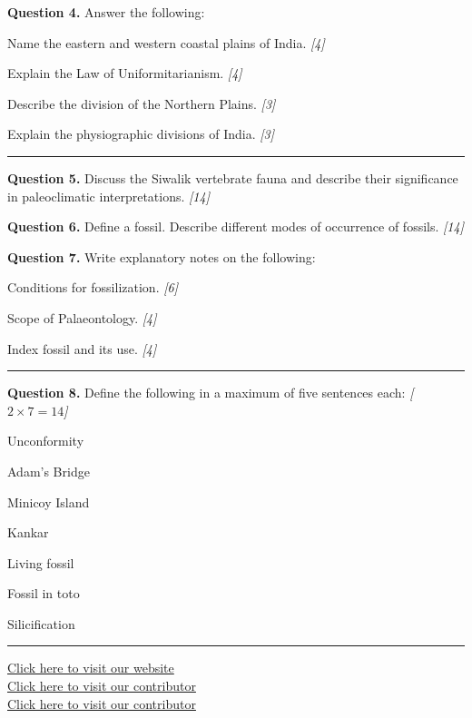 \documentclass[11pt,a4paper]{article}
\newcommand{\pts}[1]{\hfill   \textit{[#1]}}
\begin{document}
\medskip


\noindent   \textbf{Question 4.} Answer the following:

\begin{parts}
  \item Name the eastern and western coastal plains of India. \pts{4}
  \item Explain the Law of Uniformitarianism. \pts{4}
  \item Describe the division of the Northern Plains. \pts{3}
  \item Explain the physiographic divisions of India. \pts{3}
\end{parts}

\bigskip


\rule{\linewidth}{0.4pt}\smallskip




\noindent   \textbf{Question 5.} Discuss the Siwalik vertebrate fauna and describe their significance in paleoclimatic interpretations. \pts{14}

\medskip


\noindent   \textbf{Question 6.} Define a fossil. Describe different modes of occurrence of fossils. \pts{14}

\medskip


\noindent   \textbf{Question 7.} Write explanatory notes on the following:

\begin{parts}
  \item Conditions for fossilization. \pts{6}
  \item Scope of Palaeontology. \pts{4}
  \item Index fossil and its use. \pts{4}
\end{parts}

\bigskip


\rule{\linewidth}{0.4pt}\smallskip




\noindent   \textbf{Question 8.} Define the following in a maximum of five sentences each: \pts{$2  \times 7 = 14$}

\begin{romanparts}
  \item Unconformity
  \item Adam's Bridge
  \item Minicoy Island
  \item Kankar
  \item Living fossil
  \item Fossil in toto
  \item Silicification
\end{romanparts}

\vfill\rule{\linewidth}{0.4pt}

\begin{center}\small
\href{https://bhu-exam.vercel.app/}{Click here to visit our website}\\[4pt]
\href{https://me-aryan.vercel.app/}{Click here to visit our contributor}\\[4pt]
\href{https://quashan-me.vercel.app/}{Click here to visit our contributor}
\end{center}
\end{document}
